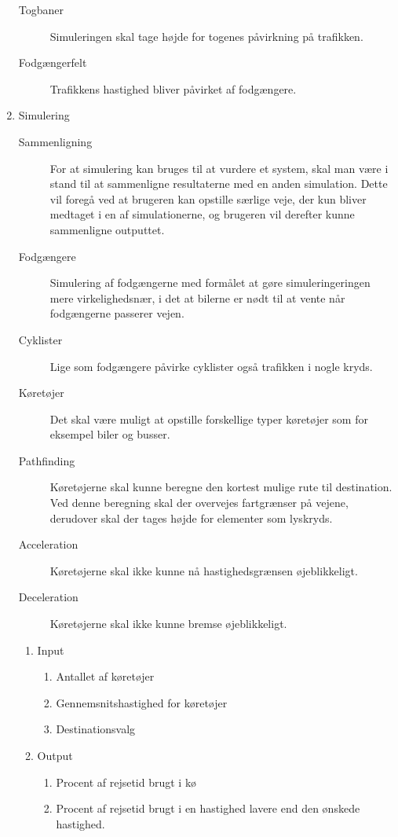 \begin{enumerate}
\begin{description}
	\item [Togbaner] Simuleringen skal tage højde for togenes påvirkning på trafikken.
	\item [Fodgængerfelt] Trafikkens hastighed bliver påvirket af fodgængere.
	\end{description}
\item Simulering
    \begin{description}
    \item [Sammenligning] For at simulering kan bruges til at vurdere et system, skal man være i stand til at sammenligne resultaterne med en anden simulation. Dette vil foregå ved at brugeren kan opstille særlige veje, der kun bliver medtaget i en af simulationerne, og brugeren vil derefter kunne sammenligne outputtet.
    \item [Fodgængere] Simulering af fodgængerne med formålet at gøre simuleringeringen mere virkelighedsnær, i det at bilerne er nødt til at vente når fodgængerne passerer vejen.
    \item [Cyklister] Lige som fodgængere påvirke cyklister også trafikken i nogle kryds.
    \item [Køretøjer] Det skal være muligt at opstille forskellige typer køretøjer som for eksempel biler og busser.
    \item [Pathfinding] Køretøjerne skal kunne beregne den kortest mulige rute til destination. Ved denne beregning skal der overvejes fartgrænser på vejene, derudover skal der tages højde for elementer som lyskryds.
    \item [Acceleration] Køretøjerne skal ikke kunne nå hastighedsgrænsen øjeblikkeligt.
    \item [Deceleration] Køretøjerne skal ikke kunne bremse øjeblikkeligt.
    \end{description}
    \begin{enumerate}
    \item Input
        \begin{enumerate}
        \item Antallet af køretøjer
        \item Gennemsnitshastighed for køretøjer
        \item Destinationsvalg
        \end{enumerate}
    \item Output
        \begin{enumerate}
        \item Procent af rejsetid brugt i kø
        \item Procent af rejsetid brugt i en hastighed lavere end den ønskede hastighed.
        \end{enumerate}
    \end{enumerate}
\end{enumerate}

